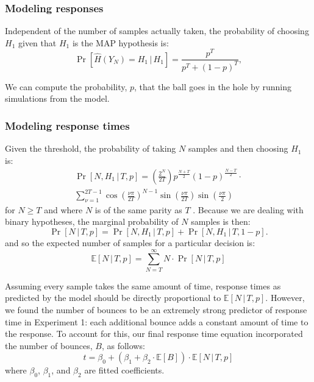 \documentclass[10pt,letterpaper]{article}
\begin{document}
\subsubsection{Modeling responses} Independent of the number of samples actually taken, the probability of choosing $H_1$ given that $H_1$ is the MAP hypothesis is:
\begin{equation}
\Pr[\hat{H}(Y_N)=H_1\,|\,H_1]=\frac{p^T}{p^T+(1-p)^T},
\label{eq:pr-choose-h1}
\end{equation}

We can compute the probability, $p$, that the ball goes in the hole by running simulations from the model.

\subsubsection{Modeling response times} Given the threshold, the probability of taking $N$ samples and then choosing $H_1$ is:
\begin{multline}
\Pr[N,H_1\,|\,T,p]=\left(\frac{2^N}{2T}\right)p^{\frac{N+T}{2}}(1-p)^{\frac{N-T}{2}}\cdot{}\\
\sum_{\nu=1}^{2T-1}\cos\left(\frac{\nu\pi}{2T}\right)^{N-1}\sin\left(\frac{\nu\pi}{2T}\right)\sin\left(\frac{\nu\pi}{2}\right)
\end{multline}
for $N\geq T$ and where $N$ is of the same parity as $T$ \cite[ch.~XIV, eq. 5.7]{Feller:1968ut}. Because we are dealing with binary hypotheses, the marginal probability of $N$ samples is then:
\begin{equation}
\Pr[N\,|\,T,p]=\Pr[N,H_1\,|\,T,p]+\Pr[N,H_1\,|\,T,1-p].
\label{eq:pr-n}
\end{equation}
and so the expected number of samples for a particular decision is:
\begin{equation}
\mathbb{E}[N\,|\,T,p]=\sum_{N=T}^\infty N\cdot{}\Pr[N\,|\,T,p]
\end{equation}

Assuming every sample takes the same amount of time, response times as predicted by the model should be directly proportional to $\mathbb{E}[N\,|\,T,p]$. However, we found the number of bounces to be an extremely strong predictor of response time in Experiment 1: each additional bounce adds a constant amount of time to the response. To account for this, our final response time equation incorporated the number of bounces, $B$, as follows:
\begin{equation}
t = \beta_0 + (\beta_1 + \beta_2\cdot{}\mathbb{E}[B]) \cdot{}\mathbb{E}[N\,|\,T,p]
\label{eq:rt}
\end{equation}
where $\beta_0$, $\beta_1$, and $\beta_2$ are fitted coefficients.
\end{document}
